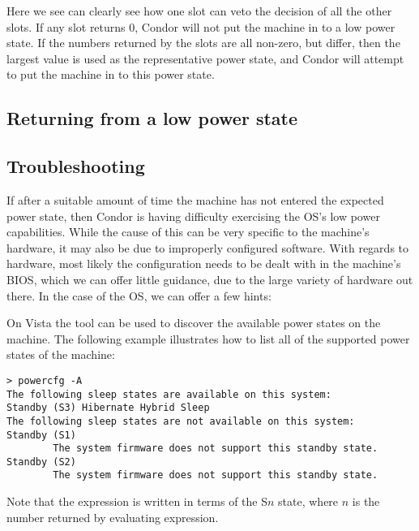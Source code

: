 Here we see can clearly see how one slot can veto the decision of all the 
other slots.  If any slot returns $0$, Condor will not put the machine in 
to a low power state.  If the numbers returned by the slots are all non-zero, 
but differ, then the largest value is used as the representative power 
state, and Condor will attempt to put the machine in to this power state.

\subsection{Returning from a low power state}
\Todo

\subsection{Troubleshooting}

If after a suitable amount of time the machine has not entered the expected 
power state, then Condor is having difficulty exercising the OS's low power 
capabilities.  While the cause of this can be very specific to the machine's
hardware, it may also be due to improperly configured software.  
With regards to hardware, most likely the configuration needs to be dealt with
in the machine's BIOS, which we can offer little guidance, due to the 
large variety of hardware out there.  In the case of the OS, we can offer
a few hints:

On Vista the  tool can be used to discover the available 
power states on the machine.  The following example illustrates how to
list all of the supported power states of the machine:

\begin{verbatim}
> powercfg -A
The following sleep states are available on this system: 
Standby (S3) Hibernate Hybrid Sleep
The following sleep states are not available on this system:
Standby (S1)
        The system firmware does not support this standby state.
Standby (S2)
        The system firmware does not support this standby state.
\end{verbatim}

Note that the  expression is written in terms of the 
S$n$ state, where $n$ is the number returned by evaluating expression.


